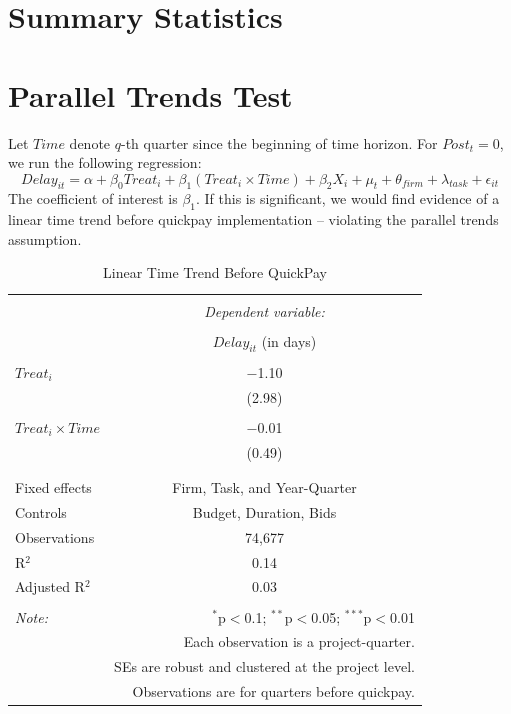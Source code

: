 \documentclass[
]{article}
\begin{document}
\hypertarget{summary-statistics}{%
\section{Summary Statistics}\label{summary-statistics}}

\hypertarget{parallel-trends-test}{%
\section{Parallel Trends Test}\label{parallel-trends-test}}

Let \(Time\) denote \(q\)-th quarter since the beginning of time
horizon. For \(Post_t =0\), we run the following regression:
\[ Delay_{it} = \alpha+\beta_0 Treat_i + \beta_1 (Treat_i \times Time) + \beta_2 X_i + \mu_t + \theta_{firm} + \lambda_{task} +\epsilon_{it}\]
The coefficient of interest is \(\beta_1\). If this is significant, we
would find evidence of a linear time trend before quickpay
implementation -- violating the parallel trends assumption.

\begin{table}[H] \centering 
  \caption{Linear Time Trend Before QuickPay} 
  \label{} 
\small 
\begin{tabular}{@{\extracolsep{5pt}}lc} 
\\[-1.8ex]\hline 
\hline \\[-1.8ex] 
 & \multicolumn{1}{c}{\textit{Dependent variable:}} \\ 
\cline{2-2} 
\\[-1.8ex] & $Delay_{it}$ (in days) \\ 
\hline \\[-1.8ex] 
 $Treat_i$ & $-$1.10 \\ 
  & (2.98) \\ 
  & \\ 
 $Treat_i \times Time$ & $-$0.01 \\ 
  & (0.49) \\ 
  & \\ 
\hline \\[-1.8ex] 
Fixed effects & Firm, Task, and Year-Quarter \\ 
Controls & Budget, Duration, Bids \\ 
Observations & 74,677 \\ 
R$^{2}$ & 0.14 \\ 
Adjusted R$^{2}$ & 0.03 \\ 
\hline 
\hline \\[-1.8ex] 
\textit{Note:}  & \multicolumn{1}{r}{$^{*}$p$<$0.1; $^{**}$p$<$0.05; $^{***}$p$<$0.01} \\ 
 & \multicolumn{1}{r}{Each observation is a project-quarter.} \\ 
 & \multicolumn{1}{r}{SEs are robust and clustered at the project level.} \\ 
 & \multicolumn{1}{r}{Observations are for quarters before quickpay.} \\ 
\end{tabular} 
\end{table}
\end{document}
